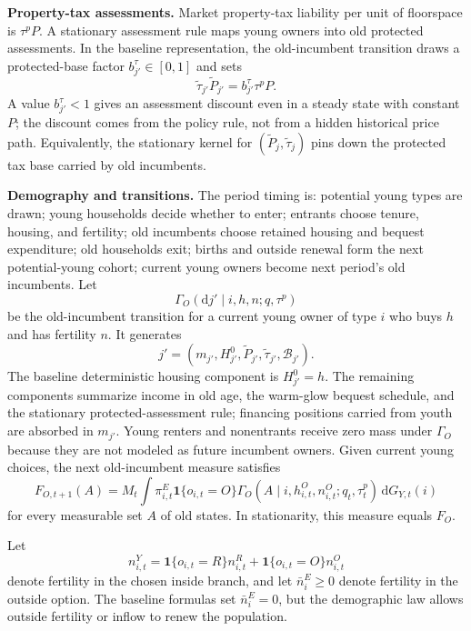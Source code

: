 \documentclass[11pt]{article}
\newcommand{\dd}{\mathrm d}
\newcommand{\1}{\mathbf 1}
\begin{document}
\textbf{Property-tax assessments.} Market property-tax liability per unit of floorspace is $\tau^p P$. A stationary assessment rule maps young owners into old protected assessments. In the baseline representation, the old-incumbent transition draws a protected-base factor $b_{j'}^\tau\in[0,1]$ and sets
\[
\tilde\tau_{j'}\tilde P_{j'}
=
b_{j'}^\tau\tau^pP.
\]
A value $b_{j'}^\tau<1$ gives an assessment discount even in a steady state with constant $P$; the discount comes from the policy rule, not from a hidden historical price path. Equivalently, the stationary kernel for $(\tilde P_j,\tilde\tau_j)$ pins down the protected tax base carried by old incumbents.

\textbf{Demography and transitions.} The period timing is: potential young types are drawn; young households decide whether to enter; entrants choose tenure, housing, and fertility; old incumbents choose retained housing and bequest expenditure; old households exit; births and outside renewal form the next potential-young cohort; current young owners become next period's old incumbents. Let
\[
\Gamma_O(\dd j'\mid i,h,n;q,\tau^p)
\]
be the old-incumbent transition for a current young owner of type $i$ who buys $h$ and has fertility $n$. It generates
\[
j'=(m_{j'},H_{j'}^0,\tilde P_{j'},\tilde\tau_{j'},\mathcal B_{j'}).
\]
The baseline deterministic housing component is $H_{j'}^0=h$. The remaining components summarize income in old age, the warm-glow bequest schedule, and the stationary protected-assessment rule; financing positions carried from youth are absorbed in $m_{j'}$. Young renters and nonentrants receive zero mass under $\Gamma_O$ because they are not modeled as future incumbent owners. Given current young choices, the next old-incumbent measure satisfies
\begin{equation}
F_{O,t+1}(A)
=
M_t\int
\pi_{i,t}^E\1\{o_{i,t}=O\}
\Gamma_O(A\mid i,h_{i,t}^O,n_{i,t}^O;q_t,\tau_t^p)\,
\dd G_{Y,t}(i)
\label{eq:compact_old_transition}
\end{equation}
for every measurable set $A$ of old states. In stationarity, this measure equals $F_O$.

Let
\begin{equation}
n_{i,t}^{Y}
=
\1\{o_{i,t}=R\}n_{i,t}^R+
\1\{o_{i,t}=O\}n_{i,t}^O
\label{eq:compact_inside_fertility}
\end{equation}
denote fertility in the chosen inside branch, and let $\bar n_i^E\ge0$ denote fertility in the outside option. The baseline formulas set $\bar n_i^E=0$, but the demographic law allows outside fertility or inflow to renew the population.
\end{document}
